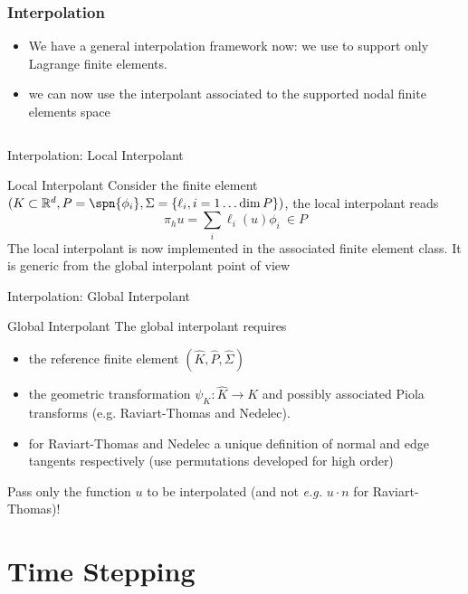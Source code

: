 \begin{frame}[fragile]
  \frametitle{Interpolation}
  \begin{itemize}
  \item We have a general interpolation framework now: we use to
    support only Lagrange finite elements.
  \item we can now use the interpolant associated to the supported
    nodal finite elements space
  \end{itemize}
  \inputminted[fontsize=\scriptsize]{c++}{Codes/prudhomme/fud4/interp.cpp}
\end{frame}
\begin{frame}{Interpolation: Local Interpolant}
  \begin{block}{Local Interpolant}
    Consider the finite element $(K\subset\mathbb{R}^d,P=\spn\{\phi_i\},\Sigma=\{\ell_i,
    i=1\ldots \dim P\})$, the local interpolant reads
    \begin{equation}
      \pi_h u = \sum_i \ell_i(u) \phi_i \ \in P
    \end{equation}
    The local interpolant is now implemented in the associated finite element
    class. It is generic from the global interpolant point of view
  \end{block}
\end{frame}
\begin{frame}{Interpolation: Global Interpolant}
  \begin{block}{Global Interpolant}
    The global interpolant requires
    \begin{itemize}
    \item the reference finite element
    $(\hat{K},\hat{P},\hat{\Sigma})$
     \item the geometric
       transformation $\psi_K : \hat{K} \rightarrow K$ and possibly
       associated Piola transforms (e.g. Raviart-Thomas and Nedelec).
     \item for Raviart-Thomas and Nedelec a unique definition of normal and edge
       tangents respectively (use permutations developed for high order)
    \end{itemize}
    \begin{alertblock}{}
      \alert{Pass only the function $u$ to be interpolated (and not \emph{e.g.} $u
      \cdot n$ for Raviart-Thomas)!}
    \end{alertblock}
  \end{block}
\end{frame}

\section{Time Stepping}

